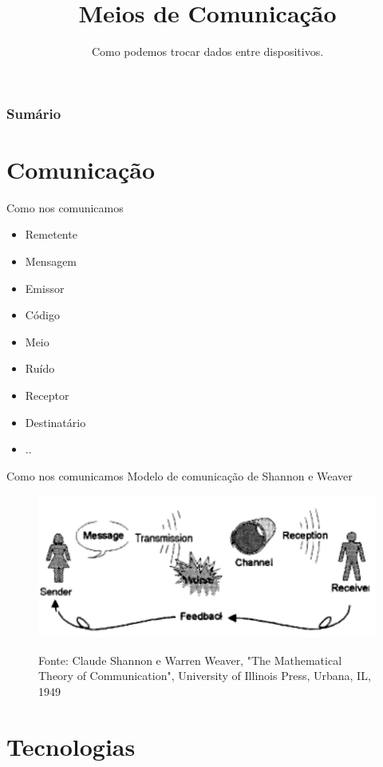 \documentclass[t]{beamer}
\title{Meios de Comunicação}
\subtitle{Como podemos trocar dados entre dispositivos.}
\begin{document}
\frame{\titlepage}

\begin{frame}
\frametitle{Sumário}
\tableofcontents
\end{frame}

\section{Comunicação}

\begin{frame}{Como nos comunicamos}
\begin{itemize}
	\item Remetente
	\item Mensagem
	\item Emissor
	\item Código
	\item Meio
	\item Ruído
	\item Receptor
	\item Destinatário
	\item ..
\end{itemize}
\end{frame}


\begin{frame}{Como nos comunicamos}
Modelo de comunicação de Shannon e Weaver
\begin{figure}
	\includegraphics[width=\linewidth]{Shannon-Weaver_model}
	
	\scriptsize Fonte: Claude Shannon e Warren Weaver, "The Mathematical Theory of Communication", University of Illinois Press, Urbana, IL, 1949
\end{figure}
\end{frame}

\section{Tecnologias}
\end{document}
